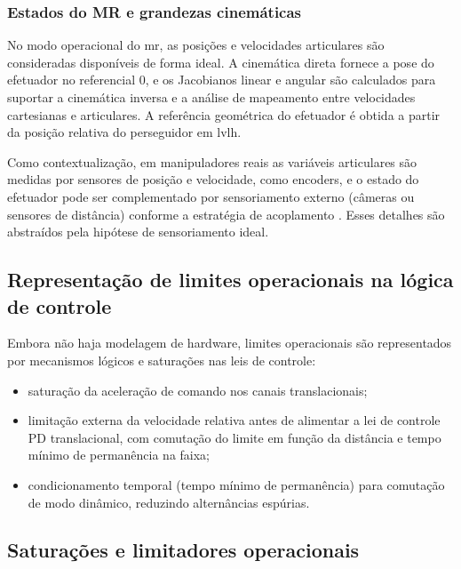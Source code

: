\subsubsection{Estados do MR e grandezas cinemáticas}
\label{subsubsec_sensoriamento_mr_cinematica}

No modo operacional do \gls{mr}, as posições e velocidades articulares são consideradas disponíveis de forma ideal.
A cinemática direta fornece a pose do efetuador no referencial 0, e os Jacobianos linear e angular são calculados para suportar a cinemática inversa e a análise de mapeamento entre velocidades cartesianas e articulares.
A referência geométrica do efetuador é obtida a partir da posição relativa do perseguidor em \gls{lvlh}.

Como contextualização, em manipuladores reais as variáveis articulares são medidas por sensores de posição e velocidade, como encoders, e o estado do efetuador pode ser complementado por sensoriamento externo (câmeras ou sensores de distância) conforme a estratégia de acoplamento \cite{fehse2003,wertz2011sme_smad}. Esses detalhes são abstraídos pela hipótese de sensoriamento ideal.

\subsection{Representação de limites operacionais na lógica de controle}
\label{subsec_limites_operacionais_logica}

Embora não haja modelagem de hardware, limites operacionais são representados por mecanismos lógicos e saturações nas leis de controle:

\begin{itemize}
\item saturação da aceleração de comando nos canais translacionais;
\item limitação externa da velocidade relativa antes de alimentar a lei de controle PD translacional, com comutação do limite em função da distância e tempo mínimo de permanência na faixa;
\item condicionamento temporal (tempo mínimo de permanência) para comutação de modo dinâmico, reduzindo alternâncias espúrias.
\end{itemize}

\subsection{Saturações e limitadores operacionais}
\label{subsec_saturacoes_limitadores_operacionais}

